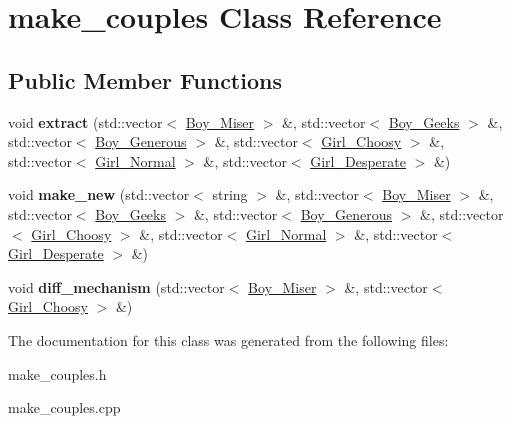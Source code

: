 \hypertarget{classmake__couples}{}\section{make\+\_\+couples Class Reference}
\label{classmake__couples}
\subsection*{Public Member Functions}
\begin{DoxyCompactItemize}
\item 
void {\bfseries extract} (std\+::vector$<$ \hyperlink{classBoy__Miser}{Boy\+\_\+\+Miser} $>$ \&, std\+::vector$<$ \hyperlink{classBoy__Geeks}{Boy\+\_\+\+Geeks} $>$ \&, std\+::vector$<$ \hyperlink{classBoy__Generous}{Boy\+\_\+\+Generous} $>$ \&, std\+::vector$<$ \hyperlink{classGirl__Choosy}{Girl\+\_\+\+Choosy} $>$ \&, std\+::vector$<$ \hyperlink{classGirl__Normal}{Girl\+\_\+\+Normal} $>$ \&, std\+::vector$<$ \hyperlink{classGirl__Desperate}{Girl\+\_\+\+Desperate} $>$ \&)\hypertarget{classmake__couples_a0bd0f1b483135fae523de30f7e788964}{}\label{classmake__couples_a0bd0f1b483135fae523de30f7e788964}

\item 
void {\bfseries make\+\_\+new} (std\+::vector$<$ string $>$ \&, std\+::vector$<$ \hyperlink{classBoy__Miser}{Boy\+\_\+\+Miser} $>$ \&, std\+::vector$<$ \hyperlink{classBoy__Geeks}{Boy\+\_\+\+Geeks} $>$ \&, std\+::vector$<$ \hyperlink{classBoy__Generous}{Boy\+\_\+\+Generous} $>$ \&, std\+::vector$<$ \hyperlink{classGirl__Choosy}{Girl\+\_\+\+Choosy} $>$ \&, std\+::vector$<$ \hyperlink{classGirl__Normal}{Girl\+\_\+\+Normal} $>$ \&, std\+::vector$<$ \hyperlink{classGirl__Desperate}{Girl\+\_\+\+Desperate} $>$ \&)\hypertarget{classmake__couples_abebd19b500c79c887719d965a959274f}{}\label{classmake__couples_abebd19b500c79c887719d965a959274f}

\item 
void {\bfseries diff\+\_\+mechanism} (std\+::vector$<$ \hyperlink{classBoy__Miser}{Boy\+\_\+\+Miser} $>$ \&, std\+::vector$<$ \hyperlink{classGirl__Choosy}{Girl\+\_\+\+Choosy} $>$ \&)\hypertarget{classmake__couples_a4dd9bf13fd92eb5bdaa18c004f932504}{}\label{classmake__couples_a4dd9bf13fd92eb5bdaa18c004f932504}

\end{DoxyCompactItemize}


The documentation for this class was generated from the following files\+:\begin{DoxyCompactItemize}
\item 
make\+\_\+couples.\+h\item 
make\+\_\+couples.\+cpp\end{DoxyCompactItemize}
